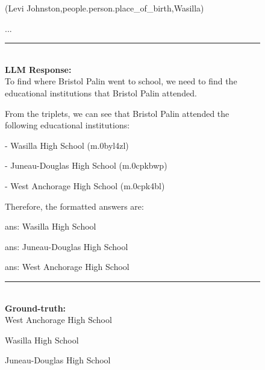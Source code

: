 \begin{figure}
\begin{tcolorbox}[colback=gray!5!white, colframe=gray!75!black, title=WebQSP-WebQTest-188]
(Levi Johnston,people.person.place\_of\_birth,Wasilla)

...

\rule{\linewidth}{0.4pt}
\\

\textbf{LLM Response:}\\
To find where Bristol Palin went to school, we need to find the educational institutions that Bristol Palin attended.



From the triplets, we can see that Bristol Palin attended the following educational institutions:



- Wasilla High School (m.0byl4zl)

- Juneau-Douglas High School (m.0cpkbwp)

- West Anchorage High School (m.0cpk4bl)



Therefore, the formatted answers are:



ans: Wasilla High School

ans: Juneau-Douglas High School

ans: West Anchorage High School

\rule{\linewidth}{0.4pt}
\\
\textbf{Ground-truth:}\\
West Anchorage High School

Wasilla High School

Juneau-Douglas High School

\end{tcolorbox}
\end{figure}



